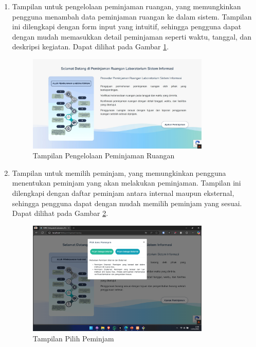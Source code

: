 \begin{enumerate}
	\item Tampilan untuk pengelolaan peminjaman ruangan, yang memungkinkan pengguna menambah data peminjaman ruangan ke dalam sistem. Tampilan ini dilengkapi dengan form input yang intuitif, sehingga pengguna dapat dengan mudah memasukkan detail peminjaman seperti waktu, tanggal, dan deskripsi kegiatan. Dapat dilihat pada Gambar \ref{fig:peminjaman-ruangan}.
	      \begin{figure}
		      \centering
		      \includegraphics[width=0.82\textwidth]{konten/gambar/perbaikan/peminjaman-ruangan.jpeg}
		      \caption{Tampilan Pengelolaan Peminjaman Ruangan}
		      \label{fig:peminjaman-ruangan}
	      \end{figure}

	\item Tampilan untuk memilih peminjam, yang memungkinkan pengguna menentukan peminjam yang akan melakukan peminjaman. Tampilan ini dilengkapi dengan daftar peminjam antara internal maupun eksternal, sehingga pengguna dapat dengan mudah memilih peminjam yang sesuai. Dapat dilihat pada Gambar \ref{fig:pilih-peminjam}.
	      \begin{figure}
		      \centering
		      \includegraphics[width=0.82\textwidth]{konten/gambar/perbaikan/pilih-peminjam.png}
		      \caption{Tampilan Pilih Peminjam}
		      \label{fig:pilih-peminjam}
	      \end{figure}
\end{enumerate}

